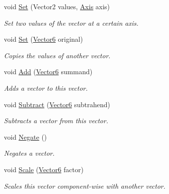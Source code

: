 \begin{DoxyCompactItemize}
void \hyperlink{class_grid_framework_1_1_vectors_1_1_vector6_a12977d2e2d209c261711760c391195c8_a12977d2e2d209c261711760c391195c8}{Set} (Vector2 values, \hyperlink{namespace_grid_framework_1_1_vectors_ad4ae859bed7702114a43e9e1b1b99360_ad4ae859bed7702114a43e9e1b1b99360}{Axis} axis)
\begin{DoxyCompactList}\small\item\em Set two values of the vector at a certain axis.\end{DoxyCompactList}\item 
void \hyperlink{class_grid_framework_1_1_vectors_1_1_vector6_ad689ca1d68c0bf615aca29ded8dc794f_ad689ca1d68c0bf615aca29ded8dc794f}{Set} (\hyperlink{class_grid_framework_1_1_vectors_1_1_vector6}{Vector6} original)
\begin{DoxyCompactList}\small\item\em Copies the values of another vector.\end{DoxyCompactList}\item 
void \hyperlink{class_grid_framework_1_1_vectors_1_1_vector6_ad1c70516cb8ebd4bb3e7027e586fe9f9_ad1c70516cb8ebd4bb3e7027e586fe9f9}{Add} (\hyperlink{class_grid_framework_1_1_vectors_1_1_vector6}{Vector6} summand)
\begin{DoxyCompactList}\small\item\em Adds a vector to this vector.\end{DoxyCompactList}\item 
void \hyperlink{class_grid_framework_1_1_vectors_1_1_vector6_aff32cc229042cc6463e9332dd69f518a_aff32cc229042cc6463e9332dd69f518a}{Subtract} (\hyperlink{class_grid_framework_1_1_vectors_1_1_vector6}{Vector6} subtrahend)
\begin{DoxyCompactList}\small\item\em Subtracts a vector from this vector.\end{DoxyCompactList}\item 
void \hyperlink{class_grid_framework_1_1_vectors_1_1_vector6_ac4e8068cbeb4f8d87bca1ef2abd9f830_ac4e8068cbeb4f8d87bca1ef2abd9f830}{Negate} ()
\begin{DoxyCompactList}\small\item\em Negates a vector.\end{DoxyCompactList}\item 
void \hyperlink{class_grid_framework_1_1_vectors_1_1_vector6_a24874f448a40d22a72469defc2717ca0_a24874f448a40d22a72469defc2717ca0}{Scale} (\hyperlink{class_grid_framework_1_1_vectors_1_1_vector6}{Vector6} factor)
\begin{DoxyCompactList}\small\item\em Scales this vector component-\/wise with another vector.\end{DoxyCompactList}\item 

\end{DoxyCompactItemize}
